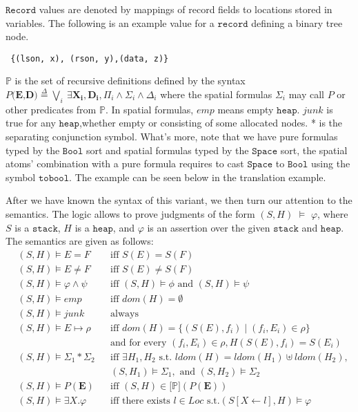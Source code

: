 \documentclass{article}
\theoremstyle{plain}
\begin{document}
$\mathtt{Record}$ values are denoted by mappings of record fields to locations stored in variables. The following is an example value for a $\mathtt{record}$ defining a binary tree node.
\begin{verbatim}
 {(lson, x), (rson, y),(data, z)}
\end{verbatim}

$\mathbb{P}$ is the set of recursive definitions defined by the syntax $P(\mathbf{E}\text{,}\mathbf{D}\text{)}\overset{\Delta}{=}\bigvee_{i}\ \exists \mathbf{X_i},\mathbf{D_i},\Pi_i\wedge \Sigma_i \wedge \Delta_i$ where the spatial formulas $\Sigma_i$ may call $P$ or other predicates from $\mathbb{P}$. In spatial formulas, $emp$ means empty $\mathtt{heap}$.  $junk$ is true for any $\mathtt{heap}$,whether empty or consisting of some allocated nodes. * is the separating conjunction symbol. What's more, note that we have pure formulas typed by the $\mathtt{Bool}$ sort and spatial formulas typed by the $\mathtt{Space}$ sort, the spatial atoms' combination with a pure formula requires to cast $\mathtt{Space}$ to $\mathtt{Bool}$ using the symbol $\mathtt{tobool}$. The example can be seen below in the translation example.

After we have known the syntax of this variant, we then turn our attention to the semantics. The logic allows to prove judgments of the form $(S,H)$ $\vDash$ $\varphi$, where $S$ is a $\mathtt{stack}$, $H$ is a $\mathtt{heap}$, and $\varphi$ is an assertion over the given $\mathtt{stack}$ and $\mathtt{heap}$. The semantics are given as follows:
\begin{align*}
   & (S,H) \models E = F  & &\text{iff } S(E) = S(F)\\
   & (S,H) \models E \neq F & &\text{iff }  S(E) \neq S(F)\\
   & (S,H) \models \varphi \wedge \psi & &\text{iff } (S,H) \models \phi \text{ and } (S,H) \models \psi\\
    &(S,H) \models emp & &\text{iff } dom(H) = \emptyset\\
    &(S,H) \models junk  \quad  & &\text{always}\\
    &(S,H) \models E \mapsto \rho & &\text{iff } dom(H) = \{(S(E),f_i) \mid (f_i,E_i) \in \rho\} \\ & & &\text{and for every } (f_i,E_i) \in \rho , H(S(E),f_i) = S(E_i) \\
    &(S,H) \models \Sigma_1 \ast \Sigma_2 & &\text{iff }  \exists H_1 , H_2 \text{ s.t. } ldom(H)=ldom(H_1) \uplus ldom(H_2),\\ & & &(S,H_1) \models \Sigma_1, \text{ and } (S,H_2) \models \Sigma_2\\
    &(S,H) \models P(\mathbf{E}) & &\text{iff } (S,H) \in  \mathbb{[}\mathbb{P]}(P(\mathbf{E}))\\
    &(S,H) \models \exists X.\varphi & &\text{iff } \text{there exists }  \mathit{l} \in Loc \text{ s.t.}  (S[X \gets \mathit{l}], H) \models \varphi
\end{align*}
\end{document}
